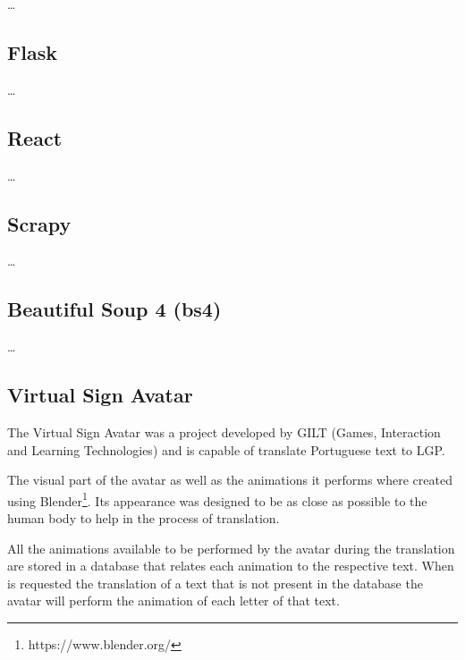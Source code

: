 \dots

\subsection{Flask}

\dots

\subsection{React}

\dots

\subsection{Scrapy}

\dots

\subsection{Beautiful Soup 4 (bs4)}

\dots

\subsection{Virtual Sign Avatar}

The Virtual Sign Avatar\cite{escudeiro2015virtual} was a project developed by GILT (Games, Interaction and Learning Technologies) and is capable of translate Portuguese text to \gls{LGP}.

The visual part of the avatar as well as the animations it performs where created using Blender\footnote{https://www.blender.org/}.
Its appearance was designed to be as close as possible to the human body to help in the process of translation.

All the animations available to be performed by the avatar during the translation are stored in a database that relates each animation to the respective text.
When is requested the translation of a text that is not present in the database the avatar will perform the animation of each letter of that text.
